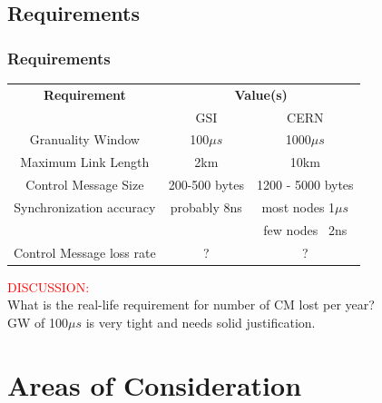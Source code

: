 \documentclass[]{beamer}
\begin{document}
\subsection{Requirements}
\begin{frame}
  \frametitle{Requirements}

\begin{table}[ht]
\centering
	\begin{tabular}{| c | c | c |}          \hline
\textbf{Requirement     }& \multicolumn{2}{|c|}{\textbf{Value(s)}}  \\
                         & GSI              & CERN          \\ \hline
Granuality Window        & 100$\mu s$       & 1000$\mu s$   \\ \hline
Maximum Link Length      & 2km              & 10km          \\ \hline
Control Message Size     & 200-500 bytes    & 1200 - 5000 bytes     \\ \hline
Synchronization accuracy & probably 8ns     & most nodes 1$\mu s$ \\
                         &                  & few nodes  ~2ns \\ \hline
Control Message loss rate&  ?               & ?                  \\ \hline

\end{tabular}
\label{tab:requirements}
\end{table}

\centering
\textcolor{red}{DISCUSSION:}\\
What is the real-life requirement for number of CM lost per year?\\
GW of 100$\mu s$ is very tight and needs solid justification.

\end{frame}

\section{Areas of Consideration}
\end{document}

